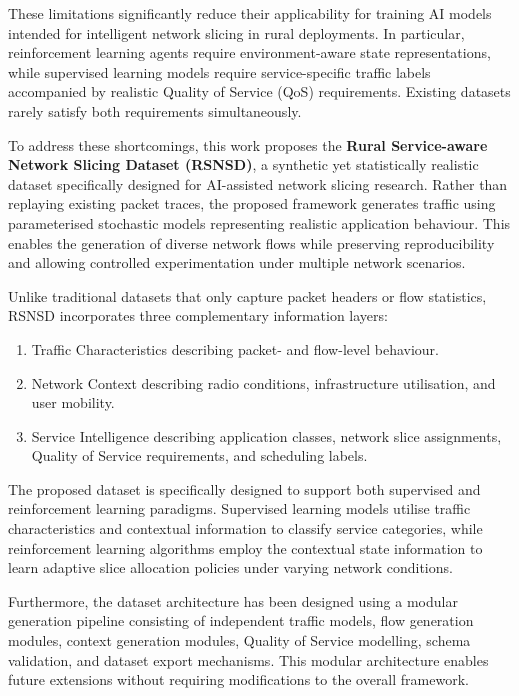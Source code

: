 \documentclass[12pt,a4paper]{article}
\begin{document}
These limitations significantly reduce their applicability for training AI models intended for intelligent network slicing in rural deployments. In particular, reinforcement learning agents require environment-aware state representations, while supervised learning models require service-specific traffic labels accompanied by realistic Quality of Service (QoS) requirements. Existing datasets rarely satisfy both requirements simultaneously.

To address these shortcomings, this work proposes the \textbf{Rural Service-aware Network Slicing Dataset (RSNSD)}, a synthetic yet statistically realistic dataset specifically designed for AI-assisted network slicing research. Rather than replaying existing packet traces, the proposed framework generates traffic using parameterised stochastic models representing realistic application behaviour. This enables the generation of diverse network flows while preserving reproducibility and allowing controlled experimentation under multiple network scenarios.

Unlike traditional datasets that only capture packet headers or flow statistics, RSNSD incorporates three complementary information layers:

\begin{enumerate}
	
	\item Traffic Characteristics describing packet- and flow-level behaviour.
	
	\item Network Context describing radio conditions, infrastructure utilisation, and user mobility.
	
	\item Service Intelligence describing application classes, network slice assignments, Quality of Service requirements, and scheduling labels.
	
\end{enumerate}

The proposed dataset is specifically designed to support both supervised and reinforcement learning paradigms. Supervised learning models utilise traffic characteristics and contextual information to classify service categories, while reinforcement learning algorithms employ the contextual state information to learn adaptive slice allocation policies under varying network conditions.

Furthermore, the dataset architecture has been designed using a modular generation pipeline consisting of independent traffic models, flow generation modules, context generation modules, Quality of Service modelling, schema validation, and dataset export mechanisms. This modular architecture enables future extensions without requiring modifications to the overall framework.
\end{document}
